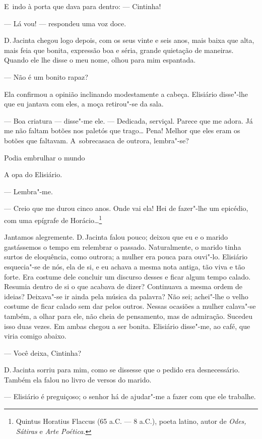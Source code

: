 \begin{linenumbers}
E~indo à porta que dava para dentro: --- Cintinha!

--- Lá vou! --- respondeu uma voz doce.

D.\,Jacinta chegou logo depois, com os seus vinte e seis anos, mais baixa
que alta, mais feia que bonita, expressão boa e séria, grande quietação
de maneiras. Quando ele lhe disse o meu nome, olhou para mim espantada.

--- Não é um bonito rapaz?

Ela confirmou a opinião inclinando modestamente a cabeça. Elisiário
disse"-lhe que eu jantava com eles, a moça retirou"-se da sala.

--- Boa criatura --- disse"-me ele. --- Dedicada, serviçal. Parece que me
adora. Já me não faltam botões nos paletós que trago\ldots{} Pena! Melhor que
eles eram os botões que faltavam. A~sobrecasaca de outrora, lembra"-se?

Podia embrulhar o mundo

A opa do Elisiário.

--- Lembra"-me.

--- Creio que me durou cinco anos. Onde vai ela! Hei de fazer"-lhe um
epicédio, com uma epígrafe de Horácio\ldots{}\footnote{Quintus Horatius Flaccus
  (65 a.C. --- 8 a.C.), poeta latino, autor de \emph{Odes, Sátiras} e
  \emph{Arte Poética. }}

Jantamos alegremente. D.\,Jacinta falou pouco; deixou que eu e o marido
gastássemos o tempo em relembrar o passado. Naturalmente, o marido tinha
surtos de eloquência, como outrora; a mulher era pouca para ouvi"-lo.
Elisiário esquecia"-se de nós, ela de si, e eu achava a mesma nota
antiga, tão viva e tão forte. Era costume dele concluir um discurso
desses e ficar algum tempo calado. Resumia dentro de si o que acabava de
dizer? Continuava a mesma ordem de ideias? Deixava"-se ir ainda pela
música da palavra? Não sei; achei"-lhe o velho costume de ficar calado
sem dar pelos outros. Nessas ocasiões a mulher calava"-se também, a olhar
para ele, não cheia de pensamento, mas de admiração. Sucedeu isso duas
vezes. Em ambas chegou a ser bonita. Elisiário disse"-me, ao café, que
viria comigo abaixo.

--- Você deixa, Cintinha?

D.\,Jacinta sorriu para mim, como se dissesse que o pedido era
desnecessário. Também ela falou no livro de versos do marido.

--- Elisiário é preguiçoso; o senhor há de ajudar"-me a fazer com que ele
trabalhe.


\end{linenumbers}
